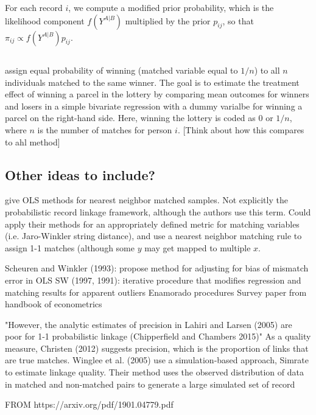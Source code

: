 \documentclass[12pt]{article}
\begin{document}
For each record $i$, we compute a modified prior probability, which is the likelihood component $f(Y^{A|B})$ multiplied by the prior $p_{ij}$, so that $\pi_{ij} \propto f(Y^{A|B}) p_{ij}$. 

\subsection{\cite{bleakley2016}}

\cite{bleakley2016} assign equal probability of winning (matched variable equal to $1/n$) to all $n$ individuals matched to the same winner.  The goal is to estimate the treatment effect of winning a parcel in the lottery by comparing mean outcomes for winners and losers in a simple bivariate regression with a dummy varialbe for winning a parcel on the right-hand side.   Here, winning the lottery is coded as $0$ or $1/n$, where $n$ is the number of matches for person $i$. [Think about how this compares to ahl method]

\subsection{Other ideas to include?}
\cite{hirukawa2018} give OLS methods for nearest neighbor matched samples.  Not explicitly the probabilistic record linkage framework, although the authors use this term. Could apply their methods for an appropriately defined metric for matching variables (i.e. Jaro-Winkler string distance), and use a nearest neighbor matching rule to assign 1-1 matches (although some $y$ may get mapped to multiple $x$. 



 Scheuren and Winkler (1993): propose method for adjusting for bias of mismatch error in OLS
 SW (1997, 1991): iterative procedure that modifies regression and matching results for apparent outliers 
 Enamorado procedures
 Survey paper from handbook of econometrics
 
 "However, the analytic estimates of precision in Lahiri
and Larsen (2005) are poor for 1-1 probabilistic linkage (Chipperfield and Chambers
2015)"   As a quality measure, Christen (2012) suggests precision, which is the proportion of
links that are true matches. Winglee et al. (2005) use a simulation-based approach,
Simrate to estimate linkage quality. Their method uses the observed distribution of
data in matched and non-matched pairs to generate a large simulated set of record 

FROM https://arxiv.org/pdf/1901.04779.pdf
 
\end{document}

